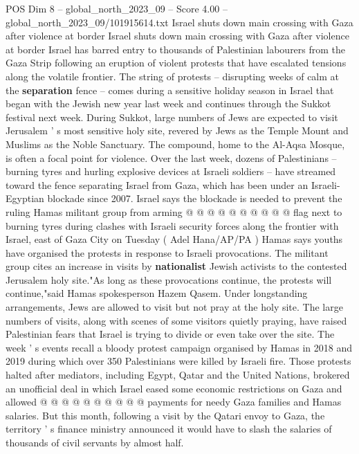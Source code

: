 \begin{textsample}{POS Dim 8 – global\_north\_2023\_09 – Score 4.00 – global\_north\_2023\_09/101915614.txt}  \label{ex:f8_pos_121}
Israel shuts down main crossing with Gaza after violence at border Israel shuts down main crossing with Gaza after violence at border Israel has barred entry to thousands of Palestinian labourers from the Gaza Strip following an eruption of violent protests that have escalated tensions along the volatile frontier.
The string of protests -- disrupting weeks of calm at the \textbf{separation} fence -- comes during a sensitive holiday season in Israel that began with the Jewish new year last week and continues through the Sukkot festival next week.
During Sukkot, large numbers of Jews are expected to visit Jerusalem ' s most sensitive holy site, revered by Jews as the Temple Mount and Muslims as the Noble Sanctuary.
The compound, home to the Al-Aqsa Mosque, is often a focal point for violence.
Over the last week, dozens of Palestinians -- burning tyres and hurling explosive devices at Israeli soldiers -- have streamed toward the fence separating Israel from Gaza, which has been under an Israeli-Egyptian blockade since 2007.
Israel says the blockade is needed to prevent the ruling Hamas militant group from arming @ @ @ @ @ @ @ @ @ @ flag next to burning tyres during clashes with Israeli security forces along the frontier with Israel, east of Gaza City on Tuesday ( Adel Hana/AP/PA ) Hamas says youths have organised the protests in response to Israeli provocations.
The militant group cites an increase in visits by \textbf{nationalist} Jewish activists to the contested Jerusalem holy site."As long as these provocations continue, the protests will continue,"said Hamas spokesperson Hazem Qasem.
Under longstanding arrangements, Jews are allowed to visit but not pray at the holy site.
The large numbers of visits, along with scenes of some visitors quietly praying, have raised Palestinian fears that Israel is trying to divide or even take over the site.
The week ' s events recall a bloody protest campaign organised by Hamas in 2018 and 2019 during which over 350 Palestinians were killed by Israeli fire.
Those protests halted after mediators, including Egypt, Qatar and the United Nations, brokered an unofficial deal in which Israel eased some economic restrictions on Gaza and allowed @ @ @ @ @ @ @ @ @ @ payments for needy Gaza families and Hamas salaries.
But this month, following a visit by the Qatari envoy to Gaza, the territory ' s finance ministry announced it would have to slash the salaries of thousands of civil servants by almost half.

\end{textsample}
